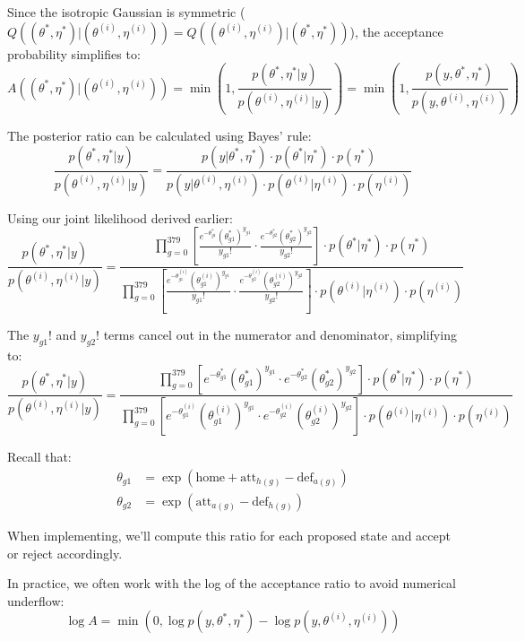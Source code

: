 \documentclass{article}
\begin{document}
\begin{enumerate}
Since the isotropic Gaussian is symmetric ($Q((\theta^*, \eta^*) | (\theta^{(i)}, \eta^{(i)})) = Q((\theta^{(i)}, \eta^{(i)}) | (\theta^*, \eta^*))$), the acceptance probability simplifies to:
\[
A((\theta^*, \eta^*) | (\theta^{(i)}, \eta^{(i)})) = \min\left(1, \frac{p(\theta^*, \eta^* | y)}{p(\theta^{(i)}, \eta^{(i)} | y)}\right) = \min\left(1, \frac{p(y, \theta^*, \eta^*)}{p(y, \theta^{(i)}, \eta^{(i)})}\right)
\]

The posterior ratio can be calculated using Bayes' rule:
\[
\frac{p(\theta^*, \eta^* | y)}{p(\theta^{(i)}, \eta^{(i)} | y)} = \frac{p(y | \theta^*, \eta^*) \cdot p(\theta^* | \eta^*) \cdot p(\eta^*)}{p(y | \theta^{(i)}, \eta^{(i)}) \cdot p(\theta^{(i)} | \eta^{(i)}) \cdot p(\eta^{(i)})}
\]

Using our joint likelihood derived earlier:
\[
\frac{p(\theta^*, \eta^* | y)}{p(\theta^{(i)}, \eta^{(i)} | y)} = \frac{
\prod_{g=0}^{379} \left[\frac{e^{-\theta^*_{g1}}(\theta^*_{g1})^{y_{g1}}}{y_{g1}!} \cdot \frac{e^{-\theta^*_{g2}}(\theta^*_{g2})^{y_{g2}}}{y_{g2}!}\right] \cdot p(\theta^* | \eta^*) \cdot p(\eta^*)}
{\prod_{g=0}^{379} \left[\frac{e^{-\theta^{(i)}_{g1}}(\theta^{(i)}_{g1})^{y_{g1}}}{y_{g1}!} \cdot \frac{e^{-\theta^{(i)}_{g2}}(\theta^{(i)}_{g2})^{y_{g2}}}{y_{g2}!}\right] \cdot p(\theta^{(i)} | \eta^{(i)}) \cdot p(\eta^{(i)})}
\]

The $y_{g1}!$ and $y_{g2}!$ terms cancel out in the numerator and denominator, simplifying to:
\[
\frac{p(\theta^*, \eta^* | y)}{p(\theta^{(i)}, \eta^{(i)} | y)} = \frac{
\prod_{g=0}^{379} \left[e^{-\theta^*_{g1}}(\theta^*_{g1})^{y_{g1}} \cdot e^{-\theta^*_{g2}}(\theta^*_{g2})^{y_{g2}}\right] \cdot p(\theta^* | \eta^*) \cdot p(\eta^*)}
{\prod_{g=0}^{379} \left[e^{-\theta^{(i)}_{g1}}(\theta^{(i)}_{g1})^{y_{g1}} \cdot e^{-\theta^{(i)}_{g2}}(\theta^{(i)}_{g2})^{y_{g2}}\right] \cdot p(\theta^{(i)} | \eta^{(i)}) \cdot p(\eta^{(i)})}
\]

Recall that:
\begin{align}
\theta_{g1} &= \exp(\text{home} + \text{att}_{h(g)} - \text{def}_{a(g)}) \\
\theta_{g2} &= \exp(\text{att}_{a(g)} - \text{def}_{h(g)})
\end{align}

When implementing, we'll compute this ratio for each proposed state and accept or reject accordingly.

In practice, we often work with the log of the acceptance ratio to avoid numerical underflow:
\[
\log A = \min\left(0, \log p(y, \theta^*, \eta^*) - \log p(y, \theta^{(i)}, \eta^{(i)})\right)
\]


\end{enumerate}
\end{document}
